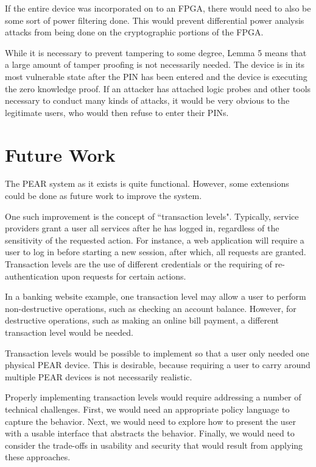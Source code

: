 If the entire device was incorporated on to an FPGA, there would need to also be some sort of power filtering done.
This would prevent differential power analysis attacks from being done on the cryptographic portions of the FPGA.

While it is necessary to prevent tampering to some degree, Lemma 5 means that a large amount of tamper proofing
is not necessarily needed. The device is in its most vulnerable state after the PIN has been entered and the device is
executing the zero knowledge proof. If an attacker has attached logic probes and other tools necessary to conduct
many kinds of attacks, it would be very obvious to the legitimate users, who would then refuse to enter their PINs.

\section{Future Work}
The PEAR system as it exists is quite functional. However, some extensions could be done as future work to improve
the system. 

One such improvement is the concept of ``transaction levels". Typically, service providers grant a user all services after
he has logged in, regardless of the sensitivity of the requested action. For instance, a web application will require a
user to log in before starting a new session, after which, all requests are granted. Transaction levels are the use of
different credentials or the requiring of re-authentication upon requests for certain actions. 

In a banking website 
example, one transaction level may allow a user to perform non-destructive operations, such as checking an account
balance. However, for destructive operations, such as making an online bill payment, a different transaction level
would be needed.

Transaction levels would be possible to implement so that a user only needed one physical PEAR device. This is
desirable, because requiring a user to carry around multiple PEAR devices is not necessarily realistic.

Properly implementing transaction levels would require addressing a number of technical challenges. First, we would 
need an appropriate policy language to capture the behavior. Next, we would need to explore how to present the user 
with a usable interface that abstracts the behavior. Finally, we would need to consider the trade-offs in 
usability and security that would result from applying these approaches.